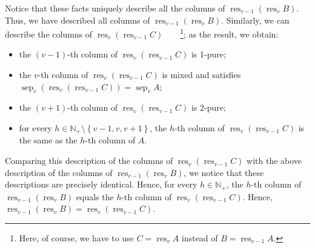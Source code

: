 \documentclass[numbers=enddot,12pt,final,onecolumn,notitlepage]{scrartcl}%
\theoremstyle{definition}
\begin{document}
Notice that these facts uniquely describe all the columns of
$\operatorname*{res}\nolimits_{v-1}\left(  \operatorname*{res}\nolimits_{v}%
B\right)  $. Thus, we have described all columns of $\operatorname*{res}%
\nolimits_{v-1}\left(  \operatorname*{res}\nolimits_{v}B\right)  $. Similarly,
we can describe the columns of $\operatorname*{res}\nolimits_{v}\left(
\operatorname*{res}\nolimits_{v-1}C\right)  $\ \ \ \ \footnote{Here, of
course, we have to use $C=\operatorname*{res}\nolimits_{v}A$ instead of
$B=\operatorname*{res}\nolimits_{v-1}A$.}; as the result, we obtain:

\begin{itemize}
\item the $\left(  v-1\right)  $-th column of $\operatorname*{res}%
\nolimits_{v}\left(  \operatorname*{res}\nolimits_{v-1}C\right)  $ is 1-pure;

\item the $v$-th column of $\operatorname*{res}\nolimits_{v}\left(
\operatorname*{res}\nolimits_{v-1}C\right)  $ is mixed and satisfies
$\operatorname*{sep}\nolimits_{v}\left(  \operatorname*{res}\nolimits_{v}%
\left(  \operatorname*{res}\nolimits_{v-1}C\right)  \right)
=\operatorname*{sep}\nolimits_{v}A$;

\item the $\left(  v+1\right)  $-th column of $\operatorname*{res}%
\nolimits_{v}\left(  \operatorname*{res}\nolimits_{v-1}C\right)  $ is 2-pure;

\item for every $h\in\mathbb{N}_{+}\setminus\left\{  v-1,v,v+1\right\}  $, the
$h$-th column of $\operatorname*{res}\nolimits_{v}\left(  \operatorname*{res}%
\nolimits_{v-1}C\right)  $ is the same as the $h$-th column of $A$.
\end{itemize}

Comparing this description of the columns of $\operatorname*{res}%
\nolimits_{v}\left(  \operatorname*{res}\nolimits_{v-1}C\right)  $ with the
above description of the columns of $\operatorname*{res}\nolimits_{v-1}\left(
\operatorname*{res}\nolimits_{v}B\right)  $, we notice that these descriptions
are precisely identical. Hence, for every $h\in\mathbb{N}_{+}$, the $h$-th
column of $\operatorname*{res}\nolimits_{v-1}\left(  \operatorname*{res}%
\nolimits_{v}B\right)  $ equals the $h$-th column of $\operatorname*{res}%
\nolimits_{v}\left(  \operatorname*{res}\nolimits_{v-1}C\right)  $. Hence,
$\operatorname*{res}\nolimits_{v-1}\left(  \operatorname*{res}\nolimits_{v}%
B\right)  =\operatorname*{res}\nolimits_{v}\left(  \operatorname*{res}%
\nolimits_{v-1}C\right)  $.
\end{document}
